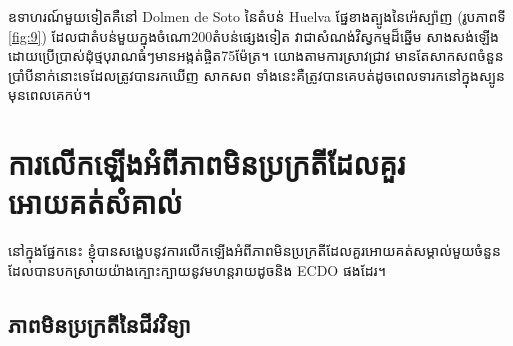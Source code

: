 \documentclass[10pt,twocolumn,letterpaper]{article}
\begin{document}
ឧទាហរណ៍មួយទៀតគឺនៅ Dolmen de Soto នៃតំបន់ Huelva ផ្នែខាងត្បូងនៃអ៉េស្ប៉ាញ (រូបភាពទី \ref{fig:9}) ដែលជាតំបន់មួយក្នុងចំណោ200តំបន់ផ្សេងទៀត\cite{72,32} វាជាសំណង់វិស្វកម្មដ៏ឆ្នើម សាងសង់ឡើងដោយប្រើប្រាស់ដុំថ្មបុរាណធំៗមានអង្កត់ផ្ចិត75ម៉ែត្រ។ យោងតាមការស្រាវជ្រាវ មានតែសាកសពចំនួនប្រាំបីនាក់នោះទេដែលត្រូវបានរកឃើញ សាកសព ទាំងនេះគឺត្រូវបានគេបត់ដូចពេលទារកនៅក្នុងស្បូនមុនពេលគេកប់។

\section{ការលើកឡើងអំពីភាពមិនប្រក្រតីដែលគួរអោយគត់សំគាល់}

នៅក្នុងផ្នែកនេះ ខ្ញុំបានសង្ខេបនូវការលើកឡើងអំពីភាពមិនប្រក្រតីដែលគួរអោយគត់សម្គាល់មួយចំនួនដែលបានបកស្រាយយ៉ាងក្បោះក្បាយនូវមហន្តរាយដូចនិង ECDO ផងដែរ។

\subsection{ភាពមិនប្រក្រតីនៃជីវវិទ្យា}
\end{document}
